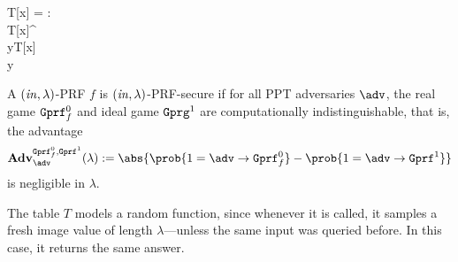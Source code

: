 \begin{security}
\begin{codebox}
\begin{center}
\begin{pchstack}
\begin{pcvstack}
{						\pcif T[x] = \bot:\\
						\pcind T[x]\sample\bin^\lambda\\
						y\gets T[x]\\
						\pcreturn y}
				\end{pcvstack}
			\end{pchstack}
		\end{center}
	\end{codebox}
	\vspace{5mm}
	A $(\mathit{in},\lambda)$-PRF $f$ is $(\mathit{in},\lambda)$-PRF-secure if for all PPT adversaries $\adv$, the real game $\text{\texttt{Gprf}}_f^0$ and ideal game $\text{\texttt{Gprg}}^1$ are computationally indistinguishable, that is, the advantage
	\[\mathbf{Adv}_{\adv}^{
		\M{Gprf}_f^0,
		\M{Gprf}^1}
		(\lambda):=\abs{\prob{1=\adv\circ \M{Gprf}_f^0}-\prob{1=\adv\circ \M{Gprf}^1}}\]
	is negligible in $\lambda$.
\end{security}

\begin{remark}
	The table $T$ models a random function, since whenever it is called, it samples a fresh image value of length $\lambda$---unless the same input was queried before. In this case, it returns the same answer.
\end{remark}





